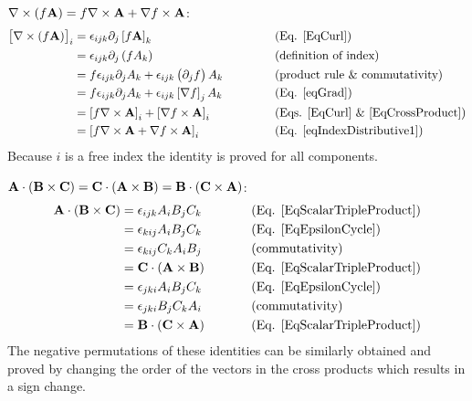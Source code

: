  $\nabla\times\left(f\mathbf{ A}\right)=f\nabla\times\mathbf{ A}+\nabla 
f\times\mathbf{ A}$:
\begin{equation}
\begin{aligned}\left[\nabla\times\left(f\mathbf{ A}\right)\right]_{i} & 
=\epsilon_{ijk}\partial_{j}\left[f\mathbf{ A}\right]_{k} & 
\,\,\,\,\,\,\,\,\,\,\,\,\,\,\,\,\,\,\,\, & \text{(Eq. \ref{EqCurl})}\\
 & =\epsilon_{ijk}\partial_{j}\left(fA_{k}\right) &  & \text{(definition of 
index)}\\
 & 
=f\epsilon_{ijk}\partial_{j}A_{k}+\epsilon_{ijk}\left(\partial_{j}f\right)A_{k} 
&  & \text{(product rule \& commutativity)}\\
 & =f\epsilon_{ijk}\partial_{j}A_{k}+\epsilon_{ijk}\left[\nabla 
f\right]_{j}A_{k} &  & \text{(Eq. \ref{eqGrad})}\\
 & =\left[f\nabla\times\mathbf{ A}\right]_{i}+\left[\nabla 
f\times\mathbf{ A}\right]_{i} &  & \text{(Eqs. \ref{EqCurl} \& 
\ref{EqCrossProduct})}\\
 & =\left[f\nabla\times\mathbf{ A}+\nabla f\times\mathbf{ A}\right]_{i} &  & 
\text{(Eq. \ref{eqIndexDistributive1})}
\end{aligned}
\end{equation}
Because $i$ is a free index the identity is proved for all components.

 
$\mathbf{ A}\cdot\left(\mathbf{ B}\times\mathbf{ C}\right)=\mathbf{ C}
\cdot\left(\mathbf{ A}\times\mathbf{ B}\right)=\mathbf{ B}\cdot\left(\mathbf{ C}
\times\mathbf{ A}\right)$:
\begin{equation}
\begin{aligned}\mathbf{ A}\cdot\left(\mathbf{ B}\times\mathbf{ C}\right) & 
=\epsilon_{ijk}A_{i}B_{j}C_{k} & \,\,\,\,\,\,\,\,\,\,\,\,\,\,\,\, & \text{(Eq. 
\ref{EqScalarTripleProduct})}\\
 & =\epsilon_{kij}A_{i}B_{j}C_{k} &  & \text{(Eq. \ref{EqEpsilonCycle})}\\
 & =\epsilon_{kij}C_{k}A_{i}B_{j} &  & \text{(commutativity)}\\
 & =\mathbf{ C}\cdot\left(\mathbf{ A}\times\mathbf{ B}\right) &  & \text{(Eq. 
\ref{EqScalarTripleProduct})}\\
 & =\epsilon_{jki}A_{i}B_{j}C_{k} &  & \text{(Eq. \ref{EqEpsilonCycle})}\\
 & =\epsilon_{jki}B_{j}C_{k}A_{i} &  & \text{(commutativity)}\\
 & =\mathbf{ B}\cdot\left(\mathbf{ C}\times\mathbf{ A}\right) &  & \text{(Eq. 
\ref{EqScalarTripleProduct})}
\end{aligned}
\end{equation}
The negative permutations of these identities can be similarly obtained
and proved by changing the order of the vectors in the cross products
which results in a sign change.

